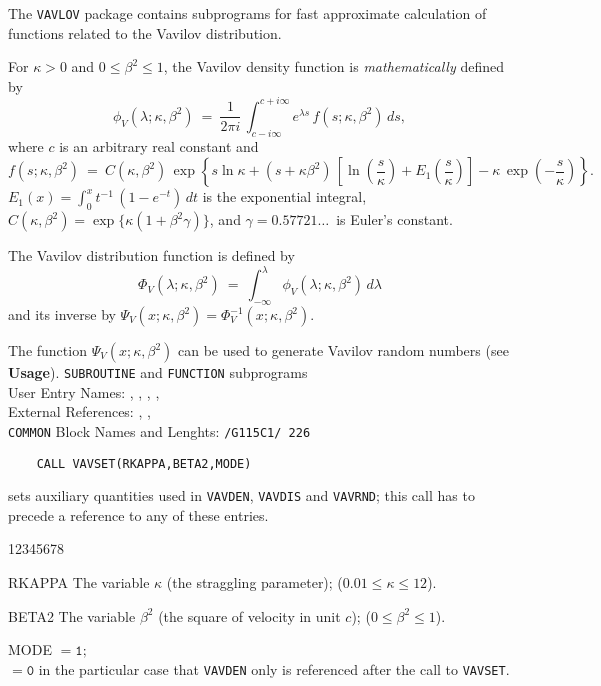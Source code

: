                
  
              
The {\tt VAVLOV} package contains subprograms for fast approximate
calculation of functions related to the Vavilov distribution.
\par
For $\kappa>0$ and $0 \le \beta^2 \le 1$,
the Vavilov density function is {\it mathematically} defined by
$$ \phi_V(\lambda;\kappa,\beta^2) \ = \ \displaystyle \frac{1}{2\pi i}\,
\int_{c-i\infty}^{c+i\infty} e^{\lambda s}\,f(s;\kappa,\beta^2)\,ds,$$
where $c$ is an arbitrary real constant and
$$ f(s;\kappa,\beta^2) \ = \ \displaystyle
C(\kappa,\beta^2)\,\exp \left\{s \ln \kappa + (s+\kappa \beta^2)\,
\left[ \ln \left(\frac{s}{\kappa}\right)
+E_1\left(\frac{s}{\kappa}\right) \right]
-\kappa\,\exp \left(-\frac{s}{\kappa}\right) \right\}. $$
$E_1(x)=\int_0^x t^{-1}\,(1-e^{-t})\,dt$ is the exponential integral,
$C(\kappa,\beta^2)=\exp\{\kappa(1+\beta^2 \gamma)\}$,
and $\gamma=0.57721\dots\,$ is Euler's constant.
\par
The Vavilov distribution function is defined by
$$ \Phi_V(\lambda;\kappa,\beta^2) \ = \ \displaystyle
\int_{-\infty}^\lambda \phi_V(\lambda;\kappa,\beta^2)\,d\lambda$$
and its inverse by
$\Psi_V(x;\kappa,\beta^2)=\Phi_V^{-1}(x;\kappa,\beta^2)$.
\par
The function $\Psi_V(x;\kappa,\beta^2)$ can be used to generate
Vavilov random numbers (see {\bf Usage}).
\Structure
{\tt SUBROUTINE} and {\tt FUNCTION} subprograms \\
User Entry Names: , , ,
                  ,  \\
External References: ,
                     ,  \\
{\tt COMMON} Block Names and Lenghts: {\tt /G115C1/ 226}
\Usage
\begin{verbatim}
    CALL VAVSET(RKAPPA,BETA2,MODE)
\end{verbatim}
sets auxiliary quantities used in {\tt VAVDEN}, {\tt VAVDIS} and
{\tt VAVRND}; this call has to precede a reference to any of these
entries.
\begin{DLtt}{12345678}
\item[RKAPPA] The variable $\kappa$ (the straggling parameter);
($0.01 \le \kappa \le 12$).
\item[BETA2] The variable $\beta^2$ (the square of velocity in unit $c$);
($0 \le \beta^2 \le 1$).
\item[MODE] $\mathtt{= 1;}$ \\
$\mathtt{= 0}$ in the particular case that {\tt VAVDEN} only is
referenced after the call to {\tt VAVSET}. \\
\end{DLtt}
